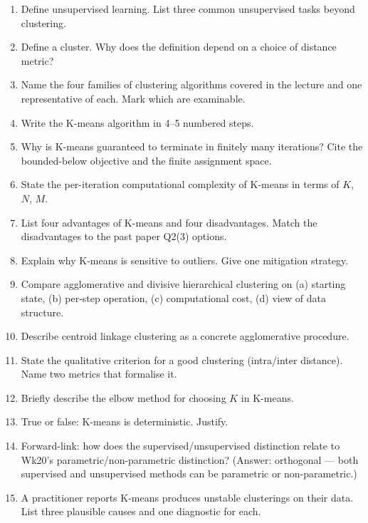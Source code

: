 \documentclass[11pt, a4paper]{article}
\begin{document}
\begin{enumerate}
  \item Define unsupervised learning. List three common unsupervised tasks beyond clustering.
  \item Define a cluster. Why does the definition depend on a choice of distance metric?
  \item Name the four families of clustering algorithms covered in the lecture and one representative of each. Mark which are examinable.
  \item Write the K-means algorithm in 4--5 numbered steps.
  \item Why is K-means guaranteed to terminate in finitely many iterations? Cite the bounded-below objective and the finite assignment space.
  \item State the per-iteration computational complexity of K-means in terms of $K$, $N$, $M$.
  \item List four advantages of K-means and four disadvantages. Match the disadvantages to the past paper Q2(3) options.
  \item Explain why K-means is sensitive to outliers. Give one mitigation strategy.
  \item Compare agglomerative and divisive hierarchical clustering on (a) starting state, (b) per-step operation, (c) computational cost, (d) view of data structure.
  \item Describe centroid linkage clustering as a concrete agglomerative procedure.
  \item State the qualitative criterion for a good clustering (intra/inter distance). Name two metrics that formalise it.
  \item Briefly describe the elbow method for choosing $K$ in K-means.
  \item True or false: K-means is deterministic. Justify.
  \item Forward-link: how does the supervised/unsupervised distinction relate to Wk20's parametric/non-parametric distinction? (Answer: orthogonal — both supervised and unsupervised methods can be parametric or non-parametric.)
  \item A practitioner reports K-means produces unstable clusterings on their data. List three plausible causes and one diagnostic for each.
\end{enumerate}
\end{document}
